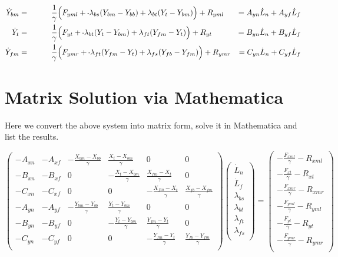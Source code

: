 \documentclass[11pt, landscape]{article}
\newcommand{\mn}{\scalebox{0.7}[1.0]{-}}
\begin{document}
\begin{align}  
  \dot{Y}_{bm} &= \hspace{1cm} \frac{1}{\gamma} \Big(F_{yml} + \mn \lambda_{bs}(Y_{bm} - Y_{bb}) + \lambda_{bt}(Y_{t } - Y_{bm}) \Big) + R_{yml} &= A_{yn}\dot{L}_n + A_{yf}\dot{L}_f\\
  \dot{Y}_{t}  &= \hspace{1cm} \frac{1}{\gamma} \Big(F_{yt } + \mn \lambda_{bt}(Y_{t } - Y_{bm}) + \lambda_{ft}(Y_{fm} - Y_{t }) \Big) + R_{yt } &= B_{yn}\dot{L}_n + B_{yf}\dot{L}_f\\
  \dot{Y}_{fm} &= \hspace{1cm} \frac{1}{\gamma} \Big(F_{ymr} + \mn \lambda_{ft}(Y_{fm} - Y_{t }) + \lambda_{fs}(Y_{fb} - Y_{fm}) \Big) + R_{ymr} &= C_{yn}\dot{L}_n + C_{yf}\dot{L}_f
\end{align}

\section{Matrix Solution via Mathematica}
Here we convert the above system into matrix form, solve it in Mathematica and list the results.

\[
\begin{pmatrix}
  -A_{xn} & -A_{xf} & -\frac{X_{bm}-X_{bb}}{\gamma} & \frac{X_{t}-X_{bm}}{\gamma} & 0 & 0\\
  -B_{xn} & -B_{xf} & 0 & -\frac{X_{t}-X_{bm}}{\gamma} & \frac{X_{fm}-X_{t}}{\gamma} & 0\\
  -C_{xn} & -C_{xf} & 0 & 0 & -\frac{X_{fm}-X_{t}}{\gamma} & \frac{X_{fb}-X_{fm}}{\gamma}\\
  -A_{yn} & -A_{yf} & -\frac{Y_{bm}-Y_{bb}}{\gamma} & \frac{Y_{t}-Y_{bm}}{\gamma} & 0 & 0\\
  -B_{yn} & -B_{yf} & 0 & -\frac{Y_{t}-Y_{bm}}{\gamma} & \frac{Y_{fm}-Y_{t}}{\gamma} & 0\\
  -C_{yn} & -C_{yf} & 0 & 0 & -\frac{Y_{fm}-Y_{t}}{\gamma} & \frac{Y_{fb}-Y_{fm}}{\gamma}\\
\end{pmatrix}
\begin{pmatrix}
  \dot{L}_n\\
  \dot{L}_f\\
  \lambda_{bs}\\
  \lambda_{bt}\\
  \lambda_{ft}\\
  \lambda_{fs}\\
\end{pmatrix}
=
\begin{pmatrix}
  -\frac{F_{xml}}{\gamma} - R_{xml}\\
  -\frac{F_{xt}}{\gamma} - R_{xt}\\
  -\frac{F_{xmr}}{\gamma} - R_{xmr}\\
  -\frac{F_{yml}}{\gamma} - R_{yml}\\
  -\frac{F_{yt}}{\gamma} - R_{yt}\\
  -\frac{F_{ymr}}{\gamma} - R_{ymr}\\
\end{pmatrix}
\]
\end{document}
